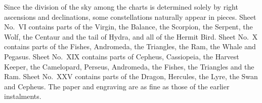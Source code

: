Since the division of the sky among the charts is determined solely by right ascensions and declinations, some constellations naturally appear in pieces. Sheet No.\ VI contains parts of the Virgin, the Balance, the Scorpion, the Serpent, the Wolf, the Centaur and the tail of Hydra, and all of the Hermit Bird. Sheet No.\ X contains parts of the Fishes, Andromeda, the Triangles, the Ram, the Whale and Pegasus. Sheet No.\ XIX contains parts of Cepheus, Cassiopeia, the Harvest Keeper, the Camelopard, Perseus, Andromeda, the Fishes, the Triangles and the Ram. Sheet No.\ XXV contains parts of the Dragon, Hercules, the Lyre, the Swan and Cepheus. The paper and engraving are as fine as those of the earlier instalments.
